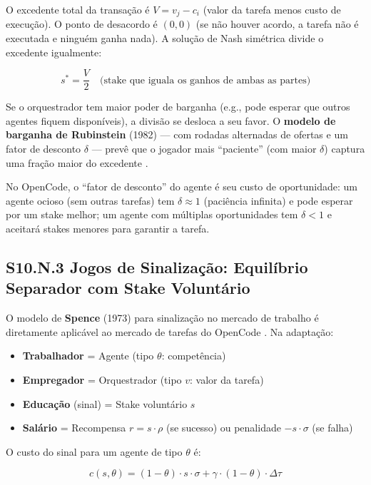 O excedente total da transação é $V = v_j - c_i$ (valor da tarefa menos custo de execução). O ponto de desacordo é $(0, 0)$ (se não houver acordo, a tarefa não é executada e ninguém ganha nada). A solução de Nash simétrica divide o excedente igualmente:

\begin{equation}
s^* = \frac{V}{2} \quad \text{(stake que iguala os ganhos de ambas as partes)}
\end{equation}

Se o orquestrador tem maior poder de barganha (e.g., pode esperar que outros agentes fiquem disponíveis), a divisão se desloca a seu favor. O \textbf{modelo de barganha de Rubinstein} (1982) --- com rodadas alternadas de ofertas e um fator de desconto $\delta$ --- prevê que o jogador mais ``paciente'' (com maior $\delta$) captura uma fração maior do excedente \cite{rubinstein1982perfect}.

No OpenCode, o ``fator de desconto'' do agente é seu custo de oportunidade: um agente ocioso (sem outras tarefas) tem $\delta \approx 1$ (paciência infinita) e pode esperar por um stake melhor; um agente com múltiplas oportunidades tem $\delta < 1$ e aceitará stakes menores para garantir a tarefa.

\subsection*{S10.N.3 Jogos de Sinalização: Equilíbrio Separador com Stake Voluntário}

O modelo de \textbf{Spence} (1973) para sinalização no mercado de trabalho é diretamente aplicável ao mercado de tarefas do OpenCode \cite{spence1973job}. Na adaptação:

\begin{itemize}
    \item \textbf{Trabalhador} = Agente (tipo $\theta$: competência)
    \item \textbf{Empregador} = Orquestrador (tipo $v$: valor da tarefa)
    \item \textbf{Educação} (sinal) = Stake voluntário $s$
    \item \textbf{Salário} = Recompensa $r = s \cdot \rho$ (se sucesso) ou penalidade $-s \cdot \sigma$ (se falha)
\end{itemize}

O custo do sinal para um agente de tipo $\theta$ é:

\begin{equation}\label{eq:signaling_cost}
c(s, \theta) = (1 - \theta) \cdot s \cdot \sigma + \gamma \cdot (1 - \theta) \cdot \Delta\tau
\end{equation}

